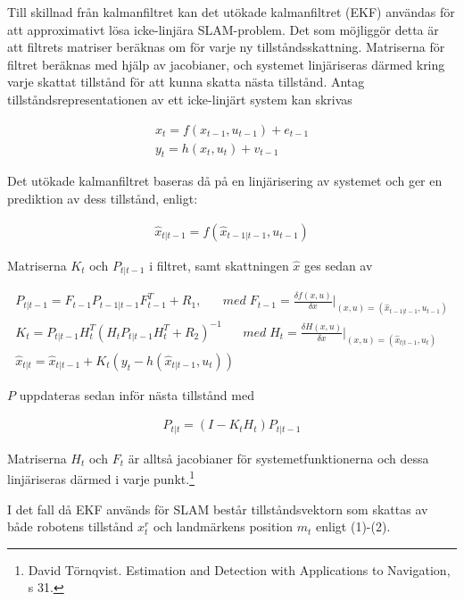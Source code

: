 \documentclass[a4paper,12pt,fleqn]{article}
\begin{document}
Till skillnad från kalmanfiltret kan det utökade kalmanfiltret (EKF) användas för att approximativt lösa icke-linjära SLAM-problem. Det som möjliggör detta är att filtrets matriser beräknas om för varje ny tillståndsskattning. Matriserna för filtret beräknas med hjälp av jacobianer, och systemet linjäriseras därmed kring varje skattat tillstånd för att kunna skatta nästa tillstånd. Antag tillståndsrepresentationen av ett icke-linjärt system kan skrivas

\begin{gather}
	x_{t} = f(x_{t-1}, u_{t-1}) + e_{t-1} \\
	y_{t} = h(x_{t},u_{t}) + v_{t-1}
\end{gather}

Det utökade kalmanfiltret baseras då på en linjärisering av systemet och ger en prediktion av dess tillstånd, enligt:

\begin{gather}
	\hat{x}_{t|t-1} = f(\hat{x}_{t-1|t-1}, u_{t-1})
\end{gather}

Matriserna $K_t$ och $P_{t|t-1}$ i filtret, samt skattningen $\hat{x}$ ges sedan av

\begin{gather}
	P_{t|t-1} = F_{t-1}P_{t-1|t-1}F^T_{t-1}+R_{1},\;\;\;\;\;\; med \; F_{t-1} = \frac{\delta f(x,u)}{\delta x}\big|_{(x,u) = (\hat{x}_{t-1|t-1}, u_{t-1})} \\
	K_{t} = P_{t|t-1}H_{t}^T(H_{t}P_{t|t-1}H_{t}^T+R_{2})^{-1}\;\;\;\;\;\; med \; H_{t} = \frac{\delta H(x,u)}{\delta x}\big|_{(x,u) = (\hat{x}_{t|t-1}, u_{t})} \\
	\hat{x}_{t|t} = \hat{x}_{t|t-1}+K_{t}(y_{t}-h(\hat{x}_{t|t-1},u_{t}))
\end{gather}

$P$ uppdateras sedan inför nästa tillstånd med

\begin{gather}
	P_{t|t} = (I-K_{t}H_{t})P_{t|t-1}
\end{gather}

Matriserna $H_t$ och $F_t$ är alltså jacobianer för systemetfunktionerna och dessa linjäriseras därmed i varje punkt.\footnote{David Törnqvist. Estimation and Detection with Applications to Navigation, s 31.}

I det fall då EKF används för SLAM består tillståndsvektorn som skattas av både robotens tillstånd $x^r_t$ och landmärkens position $m_t$ enligt (1)-(2).

\newpage
\end{document}
